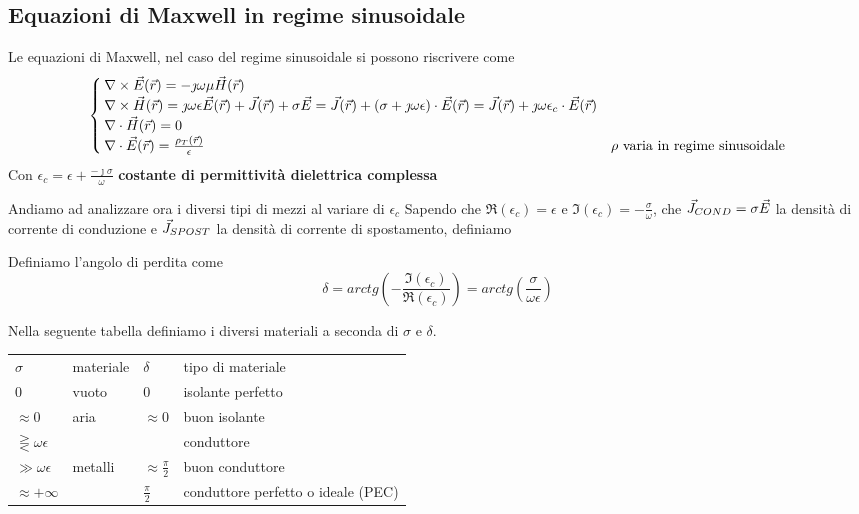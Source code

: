 \subsection{Equazioni di Maxwell in regime sinusoidale}
Le equazioni di Maxwell, nel caso del regime sinusoidale si possono riscrivere come
\begin{equation}\begin{cases}
  \nabla\times\vec{E}(\vec{r}) = -\jmath \omega \mu\vec{H}(\vec{r}) \\
  \nabla\times\vec{H}(\vec{r}) = \jmath  \omega \epsilon \vec{E}(\vec{r}) + \vec{J}(\vec{r}) + \sigma\vec{E} = \vec{J}(\vec{r}) +(\sigma + \jmath \omega \epsilon) \cdot \vec{E}(\vec{r}) = \vec{J}(\vec{r}) +\jmath \omega \epsilon_c \cdot \vec{E}(\vec{r}) \\
  \nabla\cdot\vec{H}(\vec{r})=0\\
  \nabla\cdot \vec{E}(\vec{r}) = \frac{\rho_T(\vec{r})}{\epsilon} & \rho \text{ varia in regime sinusoidale}
\end{cases}\end{equation}
Con $\epsilon_c = \epsilon + \frac{-\jmath\sigma}{\omega}$ \textbf{costante di permittività
dielettrica complessa}

Andiamo ad analizzare ora i diversi tipi di mezzi al variare di $\epsilon_c$
Sapendo che $\Re(\epsilon_c) = \epsilon$ e  $\Im(\epsilon_c) = -\frac{\sigma}{\omega}$,
che $\vec{J}_{COND} = \sigma \vec{E}$ la densità di corrente di conduzione e $\vec{J}_{SPOST}$ la densità
di corrente di spostamento, definiamo
\begin{definition}
  Definiamo l'angolo di perdita come
  \begin{equation}
    \delta = arctg\left(-\frac{\Im(\epsilon_c)}{\Re(\epsilon_c)}\right) = arctg\left(\frac{\sigma}{\omega \epsilon}\right)
    \end{equation}
\end{definition}

Nella seguente tabella definiamo i diversi materiali a seconda di $\sigma$ e $\delta$.
\begin{table}[h]
\centering
\label{tab:conductors}
\begin{tabular}{llll}
$\sigma$                      & materiale & $\delta$                & tipo di materiale                  \\
0                             & vuoto     & 0                       & isolante perfetto                  \\
$\approx 0$                   & aria      & $\approx 0$             & buon isolante                      \\
$\gtreqless \omega \epsilon $ &           &                         & conduttore                         \\
$\gg \omega \epsilon$         & metalli   & $\approx \frac{\pi}{2}$ & buon conduttore                    \\
$\approx +\infty$             &           & $\frac{\pi}{2}$         & conduttore perfetto o ideale (PEC)
\end{tabular}
\end{table}
